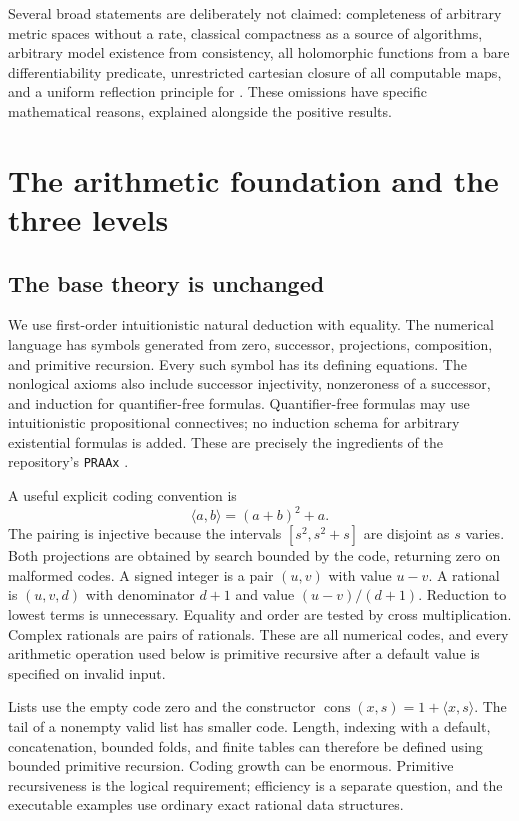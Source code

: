 Several broad statements are deliberately not claimed: completeness of arbitrary
metric spaces without a rate, classical compactness as a source of algorithms,
arbitrary model existence from consistency, all holomorphic functions from a
bare differentiability predicate, unrestricted cartesian closure of all computable
maps, and a uniform reflection principle for \ipra. These omissions have specific
mathematical reasons, explained alongside the positive results.

\section{The arithmetic foundation and the three levels}\label{sec:levels}

\subsection{The base theory is unchanged}

We use first-order intuitionistic natural deduction with equality. The numerical
language has symbols generated from zero, successor, projections, composition,
and primitive recursion. Every such symbol has its defining equations. The
nonlogical axioms also include successor injectivity, nonzeroness of a successor,
and induction for quantifier-free formulas. Quantifier-free formulas may use
intuitionistic propositional connectives; no induction schema for arbitrary
existential formulas is added. These are precisely the ingredients of the
repository's \texttt{PRAAx} \cite{repo-pr}.

A useful explicit coding convention is
\[
 \langle a,b\rangle=(a+b)^2+a.
\]
The pairing is injective because the intervals
$[s^2,s^2+s]$ are disjoint as $s$ varies. Both projections are obtained by search
bounded by the code, returning zero on malformed codes. A signed integer is a
pair $(u,v)$ with value $u-v$. A rational is $(u,v,d)$ with denominator $d+1$ and
value $(u-v)/(d+1)$. Reduction to lowest terms is unnecessary. Equality and order
are tested by cross multiplication. Complex rationals are pairs of rationals.
These are all numerical codes, and every arithmetic operation used below is
primitive recursive after a default value is specified on invalid input.

Lists use the empty code zero and the constructor
$\operatorname{cons}(x,s)=1+\langle x,s\rangle$. The tail of a nonempty valid
list has smaller code. Length, indexing with a default, concatenation, bounded
folds, and finite tables can therefore be defined using bounded primitive
recursion. Coding growth can be enormous. Primitive recursiveness is the
logical requirement; efficiency is a separate question, and the executable
examples use ordinary exact rational data structures.

